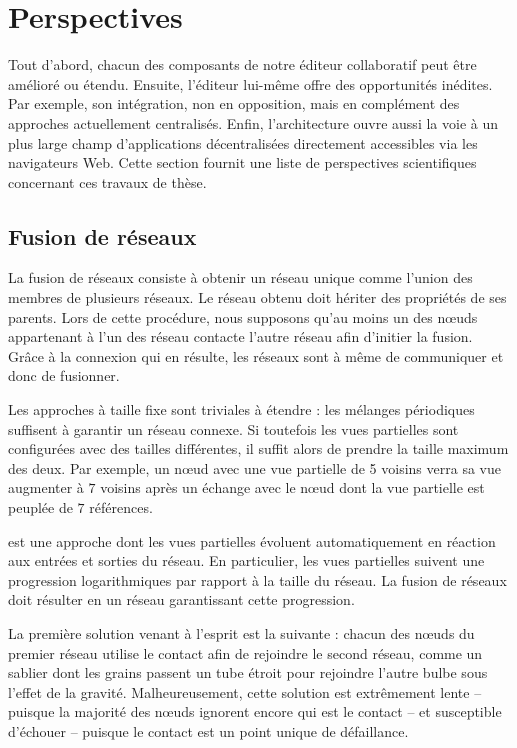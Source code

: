 
\section{Perspectives}
\label{conclu:sec:perspectives}

Tout d'abord, chacun des composants de notre éditeur collaboratif peut être
amélioré ou étendu. Ensuite, l'éditeur lui-même offre des opportunités
inédites. Par exemple, son intégration, non en opposition, mais en complément
des approches actuellement centralisés. Enfin, l'architecture ouvre aussi la
voie à un plus large champ d'applications décentralisées directement accessibles
via les navigateurs Web. Cette section fournit une liste de perspectives
scientifiques concernant ces travaux de thèse.

\subsection{Fusion de réseaux}

\label{conclu:subsec:merging}

La fusion de réseaux consiste à obtenir un réseau unique comme l'union des
membres de plusieurs réseaux. Le réseau obtenu doit hériter des propriétés de
ses parents.  Lors de cette procédure, nous supposons qu'au moins un des nœuds
appartenant à l'un des réseau contacte l'autre réseau afin d'initier la
fusion. Grâce à la connexion qui en résulte, les réseaux sont à même de
communiquer et donc de fusionner.

Les approches à taille fixe sont triviales à étendre : les mélanges périodiques
suffisent à garantir un réseau connexe. Si toutefois les vues partielles sont
configurées avec des tailles différentes, il suffit alors de prendre la taille
maximum des deux. Par exemple, un nœud avec une vue partielle de 5 voisins verra
sa vue augmenter à $7$ voisins après un échange avec le nœud dont la vue
partielle est peuplée de $7$ références.

\SPRAY est une approche dont les vues partielles évoluent automatiquement en
réaction aux entrées et sorties du réseau. En particulier, les vues partielles
suivent une progression logarithmiques par rapport à la taille du réseau. La
fusion de réseaux \SPRAY doit résulter en un réseau \SPRAY garantissant cette
progression.

\noindent La première solution venant à l'esprit est la suivante : chacun des
nœuds du premier réseau utilise le contact afin de rejoindre le second réseau,
comme un sablier dont les grains passent un tube étroit pour rejoindre l'autre
bulbe sous l'effet de la gravité. Malheureusement, cette solution est
extrêmement lente -- puisque la majorité des nœuds ignorent encore qui est le
contact -- et susceptible d'échouer -- puisque le contact est un point unique de
défaillance.

